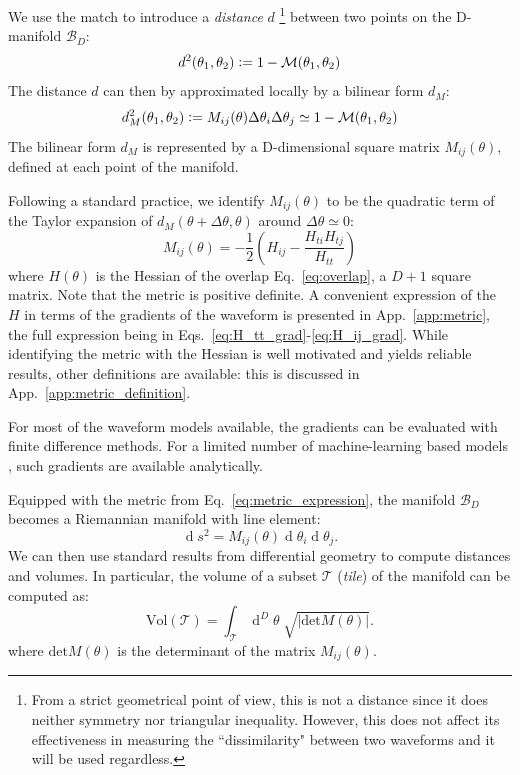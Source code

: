 \documentclass[twocolumn,showpacs,preprintnumbers,nofootinbib,prd,
superscriptaddress,10pt]{revtex4-2}
\renewcommand{\d}[1]{\ensuremath{\operatorname{d}\!{#1}}}
\newcommand{\dvol}[2]{\ensuremath{\operatorname{d}^{#2}\!{#1}}}
\begin{document}
We use the match to introduce a {\it distance} $d$ \footnote{
From a strict geometrical point of view, this is not a distance since it does neither symmetry nor triangular inequality. However, this does not affect its effectiveness in measuring the ``dissimilarity" between two waveforms and it will be used regardless.}
between two points on the D-manifold $\mathcal{B}_D$:
\begin{align}\label{eq:distance}
	d^2(\theta_1,\theta_2) \vcentcolon= 1 - \mathcal{M}(\theta_1,\theta_2)
\end{align}
The distance $d$ can then by approximated locally by a bilinear form $d_M$:
\begin{align}\label{eq:metric_definition}
	d_M^2(\theta_1,\theta_2) \vcentcolon= M_{ij}(\theta) \Delta\theta_i \Delta\theta_j \simeq 1 - \mathcal{M}(\theta_1,\theta_2)
\end{align}
The bilinear form $d_M$ is represented by a D-dimensional square matrix $M_{ij}(\theta)$, defined at each point of the manifold.

Following a standard practice, we identify $M_{ij}(\theta)$ to be the quadratic term of the Taylor expansion of $d_M(\theta+\Delta\theta,\theta)$ around $\Delta\theta\simeq 0$:
\begin{equation}\label{eq:metric_expression}
	M_{ij}(\theta) = - \frac{1}{2} \left( H_{ij} - \frac{H_{ti}H_{tj}}{H_{tt}} \right)
\end{equation}
where $H(\theta)$ is the Hessian of the overlap Eq.~\eqref{eq:overlap}, a $D+1$ square matrix.
Note that the metric is positive definite. A convenient expression of the $H$ in terms of the gradients of the waveform is presented in App.~\ref{app:metric}, the full expression being in Eqs.~\eqref{eq:H_tt_grad}-\eqref{eq:H_ij_grad}.
While identifying the metric with the Hessian is well motivated and yields reliable results, other definitions are available: this is discussed in App.~\ref{app:metric_definition}.

For most of the waveform models available, the gradients can be evaluated with finite difference methods. For a limited number of machine-learning based models \cite{Khan:2020fso, PhysRevD.103.043020, ML_wf_model, Tissino:2022thn}, such gradients are available analytically.

Equipped with the metric from Eq.~\eqref{eq:metric_expression}, the manifold $\mathcal{B}_D$ becomes a Riemannian manifold with line element:
\begin{equation}\label{eq:line_element}
	\d{s^2} = M_{ij}(\theta) \d{\theta_i} \d{\theta_j}.
\end{equation}
We can then use standard results from differential geometry to compute distances and volumes. In particular, the volume of a subset $\mathcal{T}$ ({\it tile}) of the manifold can be computed as:
\begin{equation}\label{eq:volume_tile}
	\text{Vol}(\mathcal{T}) = \int_\mathcal{T} \dvol{\theta}{D} \; \sqrt{| \text{det}M(\theta)|}.
\end{equation}
where $\text{det}M(\theta)$ is the determinant of the matrix $M_{ij}(\theta)$.
\end{document}
